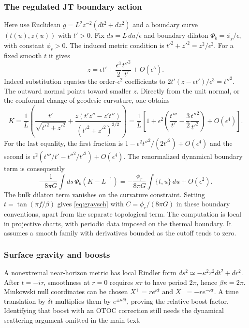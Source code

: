 \documentclass[11pt]{article}
\numberwithin{equation}{section}
\theoremstyle{exposition}
\theoremstyle{result}
\begin{document}
\subsubsection{The regulated JT boundary action}
Here use Euclidean $g=L^2z^{-2}(dt^2+dz^2)$ and a boundary curve $(t(u),z(u))$ with $t'>0$. Fix $ds=L\,du/\epsilon$ and boundary dilaton $\Phi_b=\phi_r/\epsilon$, with constant $\phi_r>0$. The induced metric condition is $t'^2+z'^2=z^2/\epsilon^2$. For a fixed smooth $t$ it gives
\begin{equation*}
z=\epsilon t'+\frac{\epsilon^3}{2}\frac{t''^2}{t'}+O(\epsilon^5).
\end{equation*}
Indeed substitution equates the order-$\epsilon^2$ coefficients to $2t'(z-\epsilon t')/\epsilon^3=t''^2$. The outward normal points toward smaller $z$. Directly from the unit normal, or the conformal change of geodesic curvature, one obtains
\begin{equation*}
K=\frac1L\left(\frac{t'}{\sqrt{t'^2+z'^2}}+
\frac{z(t'z''-z't'')}{(t'^2+z'^2)^{3/2}}\right)
=\frac1L\left[1+\epsilon^2\left(\frac{t'''}{t'}-\frac32\frac{t''^2}{t'^2}\right)+O(\epsilon^4)\right].
\end{equation*}
For the last equality, the first fraction is $1-\epsilon^2t''^2/(2t'^2)+O(\epsilon^4)$ and the second is $\epsilon^2(t'''/t'-t''^2/t'^2)+O(\epsilon^4)$. The renormalized dynamical boundary term is consequently
\begin{equation*}
-\frac1{8\pi G}\int ds\,\Phi_b(K-L^{-1})
=-\frac{\phi_r}{8\pi G}\int\{t,u\}\,du+O(\epsilon^2).
\end{equation*}
The bulk dilaton term vanishes on the curvature constraint. Setting $t=\tan(\pi f/\beta)$ gives \eqref{eq:gravsch} with $C=\phi_r/(8\pi G)$ in these boundary conventions, apart from the separate topological term. The computation is local in projective charts, with periodic data imposed on the thermal boundary. It assumes a smooth family with derivatives bounded as the cutoff tends to zero.

\subsubsection{Surface gravity and boosts}
A nonextremal near-horizon metric has local Rindler form $ds^2\simeq-\kappa^2r^2dt^2+dr^2$. After $t=-i\tau$, smoothness at $r=0$ requires $\kappa\tau$ to have period $2\pi$, hence $\beta\kappa=2\pi$. Minkowski null coordinates can be chosen $X^+=re^{\kappa t}$ and $X^-=-re^{-\kappa t}$. A time translation by $\delta t$ multiplies them by $e^{\pm\kappa\delta t}$, proving the relative boost factor. Identifying that boost with an OTOC correction still needs the dynamical scattering argument omitted in the main text.
\end{document}
